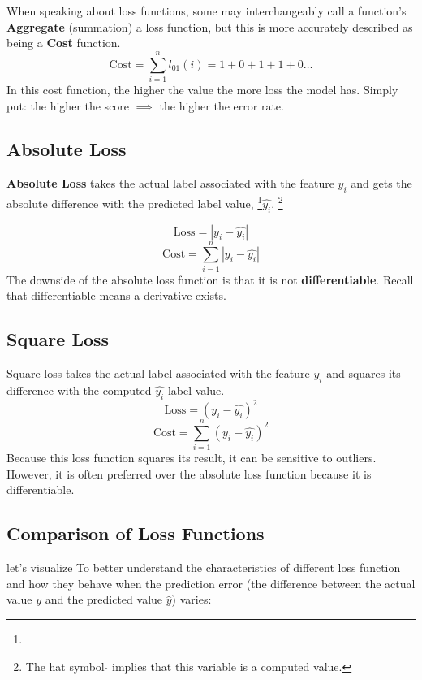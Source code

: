 When speaking about loss functions, some may interchangeably call a function's \textbf{Aggregate} (summation) a loss function, but this is more accurately described as being a \textbf{Cost} function.
\[ 
\text{Cost} = \sum_{i=1}^{n} l_{01}(i) = 1 + 0 + 1 + 1 + 0 \ldots
\]
In this cost function, the higher the value the more loss the model has. Simply put: the higher the score $\implies$ the higher the error rate.

\subsection{Absolute Loss}
\textbf{Absolute Loss} takes the actual label associated with the feature $y_i$ and gets the absolute difference with the predicted label value, \footnote{}$\hat{y_i}$.
\footnote[1]{The hat symbol $\hat{}$ implies that this variable is a computed value.}

\[ 
\text{Loss} = |y_i - \hat{y_i}|
\]
\[ 
\text{Cost} = \sum_{i=1}^{n} |y_i - \hat{y_i}|
\]
The downside of the absolute loss function is that it is not \textbf{differentiable}. Recall that differentiable means a derivative exists.

\subsection{Square Loss}
Square loss takes the actual label associated with the feature $y_i$ and squares its difference with the computed $\hat{y_i}$ label value.
\[ 
\text{Loss} = (y_i - \hat{y_i})^2
\]
\[ 
\text{Cost} = \sum_{i=1}^{n} (y_i - \hat{y_i})^2
\]
Because this loss function squares its result, it can be sensitive to outliers. However, it is often preferred over the absolute loss function because it is differentiable.


\subsection{Comparison of Loss Functions}
let's visualize To better understand the characteristics of different loss function and how they behave when the prediction error (the difference between the actual value $y$ and the predicted value $\hat{y}$) varies:

